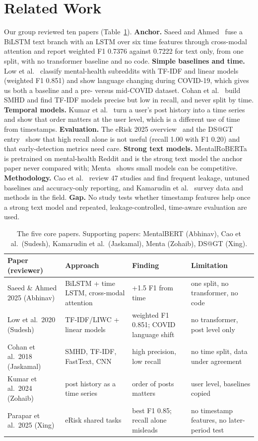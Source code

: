 \documentclass[10pt,twocolumn]{article}
\begin{document}
\section{Related Work}
Our group reviewed ten papers (Table~\ref{tab:lit}). \textbf{Anchor.} Saeed and Ahmed~\cite{saeed} fuse a BiLSTM text branch with an LSTM over six time features through cross-modal attention and report weighted F1 0.7376 against 0.7222 for text only, from one split, with no transformer baseline and no code. \textbf{Simple baselines and time.} Low et al.~\cite{low} classify mental-health subreddits with TF-IDF and linear models (weighted F1 0.851) and show language changing during COVID-19, which gives us both a baseline and a pre- versus mid-COVID dataset. Cohan et al.~\cite{cohan} build SMHD and find TF-IDF models precise but low in recall, and never split by time. \textbf{Temporal models.} Kumar et al.~\cite{kumar} turn a user's post history into a time series and show that order matters at the user level, which is a different use of time from timestamps. \textbf{Evaluation.} The eRisk 2025 overview~\cite{erisk} and the DS@GT entry~\cite{dsgt} show that high recall alone is not useful (recall 1.00 with F1 0.20) and that early-detection metrics need care. \textbf{Strong text models.} MentalRoBERTa~\cite{ji} is pretrained on mental-health Reddit and is the strong text model the anchor paper never compared with; Menta~\cite{menta} shows small models can be competitive. \textbf{Methodology.} Cao et al.~\cite{cao} review 47 studies and find frequent leakage, untuned baselines and accuracy-only reporting, and Kamarudin et al.~\cite{kamarudin} survey data and methods in the field. \textbf{Gap.} No study tests whether timestamp features help once a strong text model and repeated, leakage-controlled, time-aware evaluation are used.

\begin{table}[t]\centering\small
\begin{tabular}{p{3.0cm}p{4.3cm}p{4.2cm}p{4.5cm}}\toprule
Paper (reviewer) & Approach & Finding & Limitation \\\midrule
Saeed \& Ahmed 2025 (Abhinav) & BiLSTM + time LSTM, cross-modal attention & +1.5 F1 from time & one split, no transformer, no code \\
Low et al.\ 2020 (Sudesh) & TF-IDF/LIWC + linear models & weighted F1 0.851; COVID language shift & no transformer, post level only \\
Cohan et al.\ 2018 (Jaskamal) & SMHD, TF-IDF, FastText, CNN & high precision, low recall & no time split, data under agreement \\
Kumar et al.\ 2024 (Zohaib) & post history as a time series & order of posts matters & user level, baselines copied \\
Parapar et al.\ 2025 (Xing) & eRisk shared tasks & best F1 0.85; recall alone misleads & no timestamp features, no later-period test \\\bottomrule
\end{tabular}
\caption{The five core papers. Supporting papers: MentalBERT (Abhinav), Cao et al.\ (Sudesh), Kamarudin et al.\ (Jaskamal), Menta (Zohaib), DS@GT (Xing).}\label{tab:lit}
\end{table}
\end{document}
